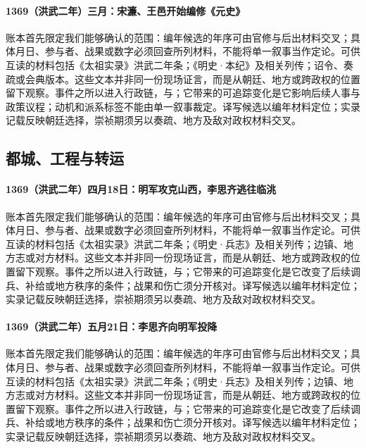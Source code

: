\paragraph{1369（洪武二年）三月：宋濂、王邑开始编修《元史》} 账本首先限定我们能够确认的范围：编年候选的年序可由官修与后出材料交叉；具体月日、参与者、战果或数字必须回查所列材料，不能将单一叙事当作定论。可供互读的材料包括《太祖实录》洪武二年条；《明史·本纪》及相关列传；诏令、奏疏或会典版本。这些文本并非同一份现场证言，而是从朝廷、地方或跨政权的位置留下观察。事件之所以进入行政链，与；它带来的可追踪变化是它影响后续人事与政策议程；动机和派系标签不能由单一叙事裁定。译写候选以编年材料定位；实录记载反映朝廷选择，崇祯期须另以奏疏、地方及敌对政权材料交叉。

\subsection{都城、工程与转运}

\paragraph{1369（洪武二年）四月18日：明军攻克山西，李思齐逃往临洮} 账本首先限定我们能够确认的范围：编年候选的年序可由官修与后出材料交叉；具体月日、参与者、战果或数字必须回查所列材料，不能将单一叙事当作定论。可供互读的材料包括《太祖实录》洪武二年条；《明史·兵志》及相关列传；边镇、地方志或对方材料。这些文本并非同一份现场证言，而是从朝廷、地方或跨政权的位置留下观察。事件之所以进入行政链，与；它带来的可追踪变化是它改变了后续调兵、补给或地方秩序的条件；战果和伤亡须分开核对。译写候选以编年材料定位；实录记载反映朝廷选择，崇祯期须另以奏疏、地方及敌对政权材料交叉。

\paragraph{1369（洪武二年）五月21日：李思齐向明军投降} 账本首先限定我们能够确认的范围：编年候选的年序可由官修与后出材料交叉；具体月日、参与者、战果或数字必须回查所列材料，不能将单一叙事当作定论。可供互读的材料包括《太祖实录》洪武二年条；《明史·兵志》及相关列传；边镇、地方志或对方材料。这些文本并非同一份现场证言，而是从朝廷、地方或跨政权的位置留下观察。事件之所以进入行政链，与；它带来的可追踪变化是它改变了后续调兵、补给或地方秩序的条件；战果和伤亡须分开核对。译写候选以编年材料定位；实录记载反映朝廷选择，崇祯期须另以奏疏、地方及敌对政权材料交叉。

